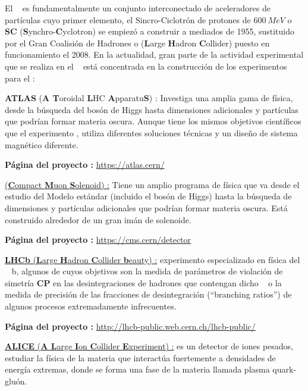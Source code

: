 El \CERN ~ es fundamentalmente un conjunto interconectado de aceleradores de partículas cuyo primer elemento, el Sincro-Ciclotrón de protones de $600 ~ MeV$ o \textbf{SC} (\textbf{S}ynchro-\textbf{C}yclotron) se empiezó a construir a mediados de 1955, sustituido por el Gran Coalisión de Hadrones  o \LHC (\textbf{L}arge \textbf{H}adron \textbf{C}ollider) puesto en funcionamiento el 2008. En la actualidad, gran parte de la actividad experimental que se realiza en el \CERN ~ está concentrada en la construcción de los experimentos para el \LHC:
\begin{itemize_f}
\item[-] \textbf{ATLAS} (\textbf{A T}oroidal \textbf{L}HC \textbf{A}pparatu\textbf{S}) : Investiga una amplia gama de física, desde la búsqueda del bosón de Higgs hasta dimensiones adicionales y partículas que podrían formar materia oscura. Aunque tiene los mismos objetivos científicos que el experimento \CMS, utiliza diferentes soluciones técnicas y un diseño de sistema magnético diferente.

\textbf{Página del proyecto :} \url{https://atlas.cern/}%

\item[-] \CMS \href{https://en.wikipedia.org/wiki/Compact_Muon_Solenoid}{(\textbf{C}ompact \textbf{M}uon \textbf{S}olenoid) :} Tiene un amplio programa de física que va desde el estudio del Modelo estándar (incluido el bosón de Higgs) hasta la búsqueda de dimensiones y partículas adicionales que podrían formar materia oscura. Está construido alrededor de un gran imán de solenoide.

\textbf{Página del proyecto :} \url{https://cms.cern/detector}%

\item[-] \href{https://es.wikipedia.org/wiki/LHCb}{\textbf{LHCb} (\textbf{L}arge \textbf{H}adron \textbf{C}ollider \textbf{b}eauty) :} experimento especializado en física del \quark ~ b, algunos de cuyos objetivos son la medida de parámetros de violación de simetría \textbf{CP} en las desintegraciones de hadrones que contengan dicho \quark ~ o la medida de precisión de las fracciones de desintegración (``branching ratios'') de algunos procesos extremadamente infrecuentes.

\textbf{Página del proyecto :} \url{http://lhcb-public.web.cern.ch/lhcb-public/}

\item[-] \href{https://en.wikipedia.org/wiki/ALICE_experiment}{\textbf{ALICE} (\textbf{A L}arge \textbf{I}on \textbf{C}ollider \textbf{E}xperiment) :} es un detector de iones pesados, estudiar la física de la materia que interactúa fuertemente a densidades de energía extremas, donde se forma una fase de la materia llamada plasma quark-gluón. 


\end{itemize_f}
